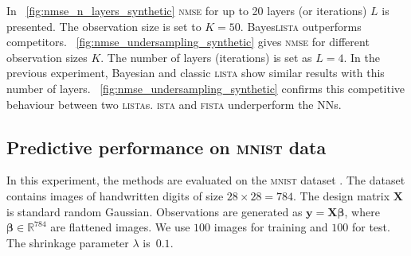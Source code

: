 \documentclass{article}
\begin{document}
  In \figurename~\ref{fig:nmse_n_layers_synthetic} \textsc{nmse} for up to 20 layers (or iterations) $L$ is presented. The observation size is set to $K=50$. Bayes\textsc{lista} outperforms competitors.
   \figurename~\ref{fig:nmse_undersampling_synthetic} gives \textsc{nmse} for different observation sizes $K$. The number of layers (iterations) is set as $L=4$. In the previous experiment, Bayesian and classic \textsc{lista} show similar results with this number of layers. \figurename~\ref{fig:nmse_undersampling_synthetic} confirms this competitive behaviour between two \textsc{lista}s. \textsc{ista} and \textsc{fista} underperform the NNs. %
  
  
  \subsection{Predictive performance on \textsc{mnist} data}
  In this experiment, the methods are evaluated on the \textsc{mnist} dataset \cite{lecun1998gradient}. The dataset contains images of handwritten digits of size $28 \times 28 = 784$. The design matrix $\mathbf{X}$ is standard random Gaussian. Observations are generated as $\mathbf{y} = \mathbf{X}\boldsymbol\beta$, where $\boldsymbol\beta \in \mathbb{R}^{784}$ are flattened images. We use $100$ images for training and $100$ for test. The shrinkage parameter $\lambda$ is~$0.1$.
  
\end{document}
